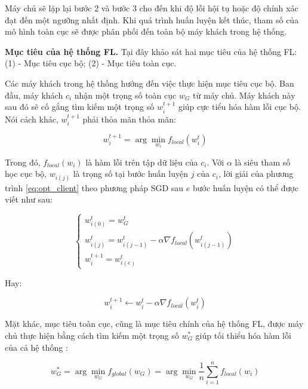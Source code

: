 Máy chủ sẽ lặp lại bước 2 và bước 3 cho đến khi độ lỗi hội tụ hoặc độ chính xác đạt đến một ngưỡng nhất định. Khi quá trình huấn luyện kết thúc, tham số của mô hình toàn cục sẽ được phân phối đến toàn bộ máy khách trong hệ thống.

\label{purpose_fl}
\textbf{Mục tiêu của hệ thống FL.} Tại đây khảo sát hai mục tiêu của hệ thống FL: (1) - Mục tiêu cục bộ; (2) - Mục tiêu toàn cục.

Các máy khách trong hệ thống hướng đến việc thực hiện mục tiêu cục bộ. Ban đầu, máy khách $c_i$ nhận một trọng số toàn cục $w_G$ từ máy chủ. Máy khách này sau đó sẽ cố gắng tìm kiếm một trọng số $w_i^{t+1}$ giúp cực tiểu hóa hàm lỗi cục bộ. Nói cách khác, $w_i^{t+1}$ phải thỏa mãn thỏa mãn:

\begin{equation}
    \label{eq:opt_client}
    w_i^{t+1} = \arg\min_{w_i}{f_{local}(w_i^t)}
\end{equation}

Trong đó, $f_{local}(w_i)$ là hàm lỗi trên tập dữ liệu của $c_i$. Với $\alpha$ là siêu tham số học cục bộ, $w_{i(j)}$ là trọng số tại bước huấn luyện $j$ của $c_i$, lời giải của phương trình \ref{eq:opt_client} theo phương pháp SGD sau $e$ bước huấn luyện có thể được viết như sau:

\begin{equation}
    \begin{cases}
        w_{i(0)}^t = w_G^t\\
        w_{i(j)}^t = w_{i(j-1)}^t - \alpha \nabla f_{local}(w_{i(j-1)}^t)\\
        w_i^{t+1} = w_{i(e)}^t
    \end{cases}
\end{equation}

Hay:

\begin{dmath}
    w_i^{t+1} \leftarrow w_i^t - \alpha\nabla f_{local}(w_i^t)
\end{dmath}

Mặt khác, mục tiêu toàn cục, cũng là mục tiêu chính của hệ thống FL, được máy chủ thực hiện bằng cách tìm kiếm một trọng số $w_G^*$ giúp tối thiểu hóa hàm lỗi của cả hệ thống \cite{yin2021comprehensive}:

\begin{dmath}
    \label{eq:opt_server}
    w_G^* = \arg \min_{w_G}{f_{global}(w_G)}
        = \arg \min_{w_G}{\frac{1}{n} \sum_{i=1}^n{f_{local}(w_i)}}
\end{dmath}

